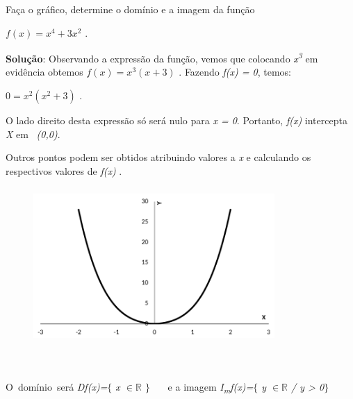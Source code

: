 \begin{texemplo}

Faça o gráfico, determine o domínio e a imagem da função 

\quad  \( f \left( x \right) =x^{4}+3x^{2} \) .

\begin{justify}
\textbf{Solução}: Observando a expressão da função, vemos que colocando \textit{x\textsuperscript{3}} em evidência obtemos  \( f \left( x \right) =x^{3} \left( x+3 \right)  \) . Fazendo \textit{f(x) = 0}, temos: 
\end{justify}

\begin{justify}
\quad  \( 0=x^{2} \left( x^{2}+3 \right)  \) .  
\end{justify}

O lado direito desta expressão só será nulo para \textit{x = 0}. Portanto, \textit{f(x)} intercepta \textit{X} em~ \textit{(0,0)}. 

Outros pontos podem ser obtidos atribuindo valores a \textit{x} e calculando os respectivos valores de \textit{f(x)} .

\begin{figure}[H]
	\begin{Center}
		\includegraphics[width=3.61in,height=2.35in]{capitulos/outras_funcoes/media/image20.pdf}
	\end{Center}
\end{figure}

~~

O~domínio~será   \textit{Df(x)=$ \{ $ x $ \in \mathbb{R} $  \textbf{ }$ \} $ }~~~e a imagem  \textit{I\textsubscript{m}f(x)=$ \{ $ y $ \in \mathbb{R} $  \textbf{ }/ y > 0$ \} $ }~ \qedsymbol{}
\end{texemplo}


